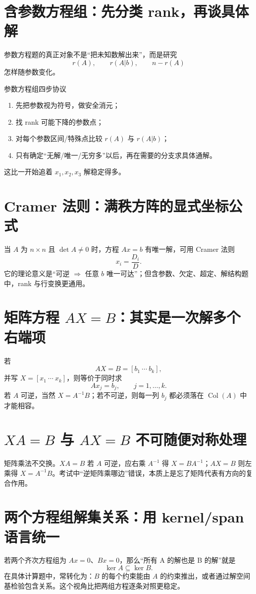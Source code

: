 \documentclass[11pt,a4paper,openany]{ctexbook}
\begin{document}
\section{含参数方程组：先分类 rank，再谈具体解}
参数方程题的真正对象不是“把未知数解出来”，而是研究
\[
r(A),\qquad r(A|b),\qquad n-r(A)
\]
怎样随参数变化。

\begin{methodbox}{参数方程组四步协议}
\begin{enumerate}
  \item 先把参数视为符号，做安全消元；
  \item 找 rank 可能下降的参数点；
  \item 对每个参数区间/特殊点比较 $r(A)$ 与 $r(A|b)$；
  \item 只有确定“无解/唯一/无穷多”以后，再在需要的分支求具体通解。
\end{enumerate}
这比一开始追着 $x_1,x_2,x_3$ 解稳定得多。
\end{methodbox}

\section{Cramer 法则：满秩方阵的显式坐标公式}
当 $A$ 为 $n\times n$ 且 $\det A\neq0$ 时，方程 $Ax=b$ 有唯一解，可用 Cramer 法则
\[
x_i=\frac{D_i}{D}.
\]
它的理论意义是“可逆 $\Rightarrow$ 任意 $b$ 唯一可达”；但含参数、欠定、超定、解结构题中，rank 与行变换更通用。

\section{矩阵方程 $AX=B$：其实是一次解多个右端项}
若
\[
AX=B=[b_1\ \cdots\ b_k],
\]
并写 $X=[x_1\ \cdots\ x_k]$，则等价于同时求
\[
Ax_j=b_j,\qquad j=1,\dots,k.
\]
若 $A$ 可逆，当然 $X=A^{-1}B$；若不可逆，则每一列 $b_j$ 都必须落在 $\operatorname{Col}(A)$ 中才能相容。

\section{$XA=B$ 与 $AX=B$ 不可随便对称处理}
矩阵乘法不交换。$XA=B$ 若 $A$ 可逆，应右乘 $A^{-1}$ 得 $X=BA^{-1}$；$AX=B$ 则左乘得 $X=A^{-1}B$。考试中“逆矩阵乘哪边”错误，本质上是忘了矩阵代表有方向的复合作用。

\section{两个方程组解集关系：用 kernel/span 语言统一}
若两个齐次方程组为 $Ax=0$、$Bx=0$，那么“所有 A 的解也是 B 的解”就是
\[
\ker A\subseteq\ker B.
\]
在具体计算题中，常转化为：$B$ 的每个约束能由 $A$ 的约束推出，或者通过解空间基检验包含关系。这个视角比把两组方程逐条对照更稳定。
\end{document}

